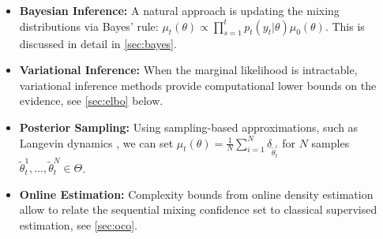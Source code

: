 \begin{itemize}
    \item \textbf{Bayesian Inference:} A natural approach is updating the mixing distributions via Bayes' rule: $\mu_t(\theta) \propto \prod_{s=1}^t p_t(y_t|\theta) \mu_0(\theta)$. This is discussed in detail in \cref{sec:bayes}.
    \item \textbf{Variational Inference:} When the marginal likelihood is intractable, variational inference methods provide computational lower bounds on the evidence, see \cref{sec:elbo} below.
    \item \textbf{Posterior Sampling:} Using sampling-based approximations, such as Langevin dynamics \citep{dwivedi2019log}, we can set $\mu_t(\theta) = \frac{1}{N} \sum_{i=1}^N \delta_{\tilde{\theta}_t^i}$ for $N$ samples $\tilde \theta_t^1, \dots, \tilde \theta_t^N \in \Theta$.
    \item \textbf{Online Estimation:} Complexity bounds from online density estimation allow to relate the sequential mixing confidence set to classical supervised estimation, see \cref{sec:oco}.
\end{itemize}


